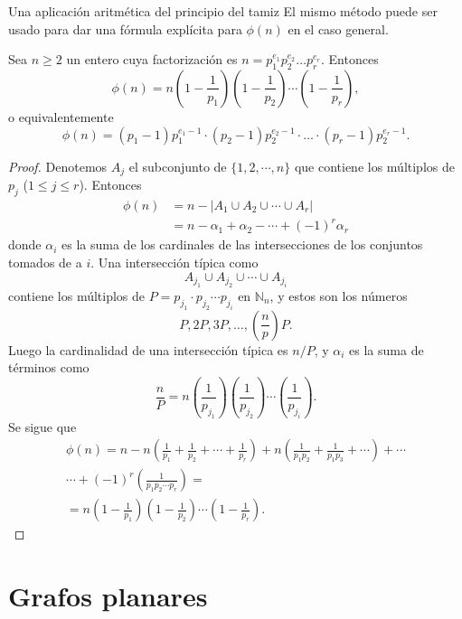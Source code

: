 \begin{section}{Una aplicación aritmética del principio del tamiz}
El mismo método puede ser usado para dar una fórmula explícita para $\phi(n)$ en el caso general.

\begin{teorema}\label{tA2.2} Sea $n \ge 2$ un entero cuya factorización es $n=p_1^{e_1}p_2^{e_2}\ldots p_r^{e_r}$. Entonces $$
\phi(n)=n\left(1-\frac{1}{p_1}\right)\left(1-\frac{1}{p_2}\right)\cdots\left(1-\frac{1}{p_r}\right),
$$
o equivalentemente
$$
\phi(n)= (p_1-1)p_1^{e_1-1}\cdot (p_2 -1)p_2^{e_2-1}\cdot \ldots  \cdot (p_r -1)p_2^{e_r-1}.
$$
\end{teorema}
\begin{proof} Denotemos $A_j$ el subconjunto de $\{1,2,\cdots, n\}$ que contiene los múltiplos de $p_j$ ($1\le j \le r$). Entonces 
$$
\begin{aligned}
\phi(n) &= n- |A_1 \cup A_2 \cup \cdots \cup A_r| \\
       &= n -\alpha_1+ \alpha_2- \cdots +(-1)^r\alpha_r
\end{aligned}
$$
donde $\alpha_i$ es la suma de los cardinales de las intersecciones de los conjuntos tomados de a $i$. Una intersección típica como
$$
A_{j_1}\cup A_{j_2}\cup \cdots \cup A_{j_i}
$$
contiene los múltiplos de $P= p_{j_1}\cdot p_{j_2}\cdots p_{j_i}$ en $\mathbb N_n$, y estos son los números
$$
P,2P,3P,\ldots,\left(\frac{n}{p}\right)P.
$$
Luego la cardinalidad de una intersección típica es $n/P$, y $\alpha_i$ es la suma de términos como
$$
\frac{n}{P}= n\left(\frac{1}{p_{j_1}}\right)\left(\frac{1}{p_{j_2}}\right)\cdots \left(\frac{1}{p_{j_i}}\right).
$$
Se sigue que
\begin{multline*}
    \phi(n) = n - n\left(\frac{1}{p_1} + \frac{1}{p_2} + \cdots +\frac{1}{p_r}\right) +n\left(\frac{1}{p_1p_2} + \frac{1}{p_1p_3}+\cdots\right) + \cdots \\
    \cdots + (-1)^r \left(\frac{1}{p_1p_2 \cdots p_r}\right) =\\
    =n\left(1-\frac{1}{p_1}\right)\left(1-\frac{1}{p_2}\right)\cdots\left(1-\frac{1}{p_r}\right).
\end{multline*}


\end{proof}

\end{section}


\chapter[Grafos planares]{Grafos planares}\label{ape.grafos_planares}

